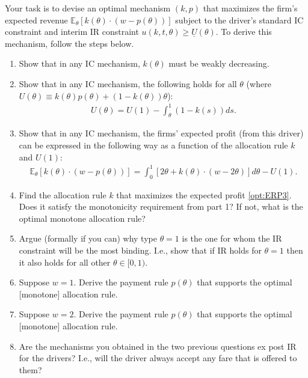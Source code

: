 \documentclass[a4paper]{article}
\begin{document}
Your task is to devise an optimal mechanism $(k,p)$ that maximizes the firm's expected revenue $\mathbb{E}_\theta [k(\theta) \cdot (w-p(\theta))]$ subject to the driver's standard IC constraint and interim IR constraint $u(k,t,\theta) \geq \underline{U}(\theta)$. To derive this mechanism, follow the steps below.


\begin{enumerate}
	\item Show that in any IC mechanism, $k(\theta)$ must be weakly decreasing.
	\item Show that in any IC mechanism, the following holds for all $\theta$ (where $U(\theta) \equiv k(\theta) p(\theta) + (1-k(\theta)) \theta$):
	\begin{align}
		\label{opt:ERP2}
		U(\theta) = U(1) - \int_{\theta}^{1} (1-k(s)) ds.
	\end{align}
	\item Show that in any IC mechanism, the firms' expected profit (from this driver) can be expressed in the following way as a function of the allocation rule $k$ and $U(1)$:
	\begin{align}
		\label{opt:ERP3}
		\mathbb{E}_\theta [k(\theta)\cdot (w-p(\theta))] = \int_0^1 \left[ 2\theta + k(\theta) \cdot (w - 2\theta ) \right] d\theta - U(1).
	\end{align}
	\item Find the allocation rule $k$ that maximizes the expected profit \eqref{opt:ERP3}. Does it satisfy the monotonicity requirement from part 1? If not, what is the optimal monotone allocation rule?
	\item Argue (formally if you can) why type $\theta=1$ is the one for whom the IR constraint will be the most binding. I.e., show that if IR holds for $\theta=1$ then it also holds for all other $\theta \in [0,1)$.
	\item Suppose $w=1$. Derive the payment rule $p(\theta)$ that supports the optimal [monotone] allocation rule.
	\item Suppose $w=2$. Derive the payment rule $p(\theta)$ that supports the optimal [monotone] allocation rule.
	\item Are the mechanisms you obtained in the two previous questions ex post IR for the drivers? I.e., will the driver always accept any fare that is offered to them?
\end{enumerate}
\end{document}
